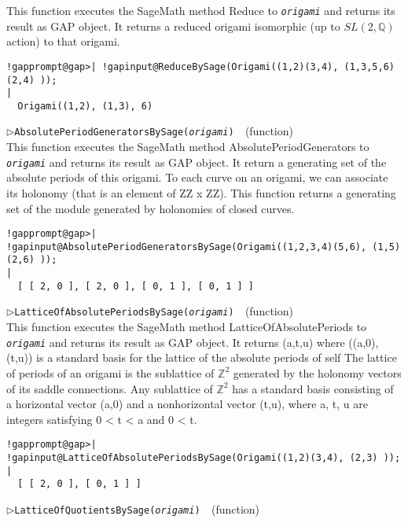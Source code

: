 \documentclass[a4paper,11pt]{report}
\begin{document}
{{{ This function executes the SageMath method Reduce to \mbox{\texttt{\mdseries\slshape origami}} and returns its result as \textsf{GAP} object. It returns a reduced origami isomorphic (up to $SL(2,\mathbb{Q})$ action) to that origami. 
\begin{Verbatim}[commandchars=!@|,fontsize=\small,frame=single,label=Example]
  !gapprompt@gap>| !gapinput@ReduceBySage(Origami((1,2)(3,4), (1,3,5,6)(2,4) ));
|
  Origami((1,2), (1,3), 6)
\end{Verbatim}
 \noindent\textcolor{FuncColor}{$\triangleright$\enspace\texttt{AbsolutePeriodGeneratorsBySage({\mdseries\slshape origami})
\label{AbsolutePeriodGeneratorsBySage}
}\hfill{\scriptsize (function)}}\\


 This function executes the SageMath method AbsolutePeriodGenerators to \mbox{\texttt{\mdseries\slshape origami}} and returns its result as \textsf{GAP} object. It return a generating set of the absolute periods of this origami. To
each curve on an origami, we can associate its holonomy (that is an element of
ZZ x ZZ). This function returns a generating set of the module generated by
holonomies of closed curves. 
\begin{Verbatim}[commandchars=!@|,fontsize=\small,frame=single,label=Example]
  !gapprompt@gap>| !gapinput@AbsolutePeriodGeneratorsBySage(Origami((1,2,3,4)(5,6), (1,5)(2,6) )); 
|
  [ [ 2, 0 ], [ 2, 0 ], [ 0, 1 ], [ 0, 1 ] ]
\end{Verbatim}
 \noindent\textcolor{FuncColor}{$\triangleright$\enspace\texttt{LatticeOfAbsolutePeriodsBySage({\mdseries\slshape origami})
\label{LatticeOfAbsolutePeriodsBySage}
}\hfill{\scriptsize (function)}}\\


 This function executes the SageMath method LatticeOfAbsolutePeriods to \mbox{\texttt{\mdseries\slshape origami}} and returns its result as \textsf{GAP} object. It returns (a,t,u) where ((a,0),(t,u)) is a standard basis for the
lattice of the absolute periods of self The lattice of periods of an origami
is the sublattice of $ \mathbb{Z}^2$ generated by the holonomy vectors of its saddle connections. Any sublattice of $ \mathbb{Z}^2$ has a standard basis consisting of a horizontal vector (a,0) and a
nonhorizontal vector (t,u), where a, t, u are integers satisfying 0
{\textless} t {\textless} a and 0 {\textless} t. 
\begin{Verbatim}[commandchars=!@|,fontsize=\small,frame=single,label=Example]
  !gapprompt@gap>| !gapinput@LatticeOfAbsolutePeriodsBySage(Origami((1,2)(3,4), (2,3) ));   
|
  [ [ 2, 0 ], [ 0, 1 ] ]
\end{Verbatim}
 \noindent\textcolor{FuncColor}{$\triangleright$\enspace\texttt{LatticeOfQuotientsBySage({\mdseries\slshape origami})
\label{LatticeOfQuotientsBySage}
}\hfill{\scriptsize (function)}}\\


}}}
\end{document}
